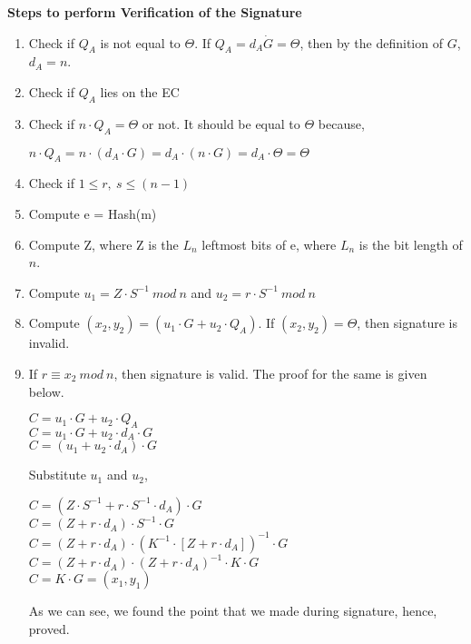 \documentclass[11pt]{article}
\begin{document}
\textbf{Steps to perform Verification of the Signature}
\begin{enumerate}
    \item Check if $Q_A$ is not equal to $\Theta$. If $Q_A = d_A \dot G = \Theta$, then by the definition of $G$, $d_A = n$.
    \item Check if $Q_A$ lies on the EC
    \item Check if $n \cdot Q_A = \Theta$ or not. It should be equal to $\Theta$ because,
    \begin{center}
        $n \cdot Q_A = n \cdot (d_A \cdot G) = d_A \cdot (n \cdot G) = d_A \cdot \Theta = \Theta$
    \end{center}
    \item Check if $1 \leq r, \ s \leq (n-1)$
    \item Compute e = Hash(m)
    \item Compute Z, where Z is the $L_n$ leftmost bits of e, where $L_n$ is the bit length of $n$.
    \item Compute $u_1 = Z \cdot S^{-1} \ mod \ n$ and $u_2 = r \cdot S^{-1} \ mod \ n$
    \item Compute $(x_2, y_2) = (u_1 \cdot G + u_2 \cdot Q_A)$. If $(x_2, y_2) = \Theta$, then signature is invalid.
    \item If $r \equiv x_2 \ mod \ n$, then signature is valid. The proof for the same is given below.
    \begin{center}
        $C = u_1 \cdot G + u_2 \cdot Q_A$\\
        \vspace{1mm}
        $C = u_1 \cdot G + u_2 \cdot d_A \cdot G$\\
        \vspace{1mm}
        $C = (u_1 + u_2 \cdot d_A) \cdot G$\\
    \end{center}
    Substitute $u_1$ and $u_2$,
    \begin{center}
        $C = (Z \cdot S^{-1} + r \cdot S^{-1} \cdot d_A) \cdot G$\\
        \vspace{1mm}
        $C = (Z + r \cdot d_A) \cdot S^{-1} \cdot G$\\
        \vspace{1mm}
        $C = (Z + r \cdot d_A) \cdot {(K^{-1} \cdot [Z + r \cdot d_A])}^{-1} \cdot G$\\
        \vspace{1mm}
        $C = (Z + r \cdot d_A) \cdot {(Z + r \cdot d_A)}^{-1} \cdot K \cdot G$\\
        \vspace{1mm}
        $C = K \cdot G = (x_1, y_1)$
    \end{center}
    As we can see, we found the point that we made during signature, hence, proved.
\end{enumerate}
\end{document}
